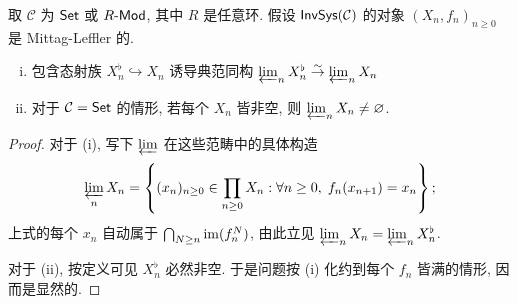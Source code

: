 \begin{lemma}\label{prop:ML-nonempty}
	取 $\mathcal{C}$ 为 $\cate{Set}$ 或 $R\dcate{Mod}$, 其中 $R$ 是任意环. 假设 $\cate{InvSys}(\mathcal{C})$ 的对象 $(X_n, f_n)_{n \geq 0}$ 是 Mittag-Leffler 的.
	\begin{enumerate}[(i)]
		\item 包含态射族 $X_n^\flat \hookrightarrow X_n$ 诱导典范同构 $\varprojlim_n X^\flat_n \rightiso \varprojlim_n X_n$
		\item 对于 $\mathcal{C} = \cate{Set}$ 的情形, 若每个 $X_n$ 皆非空, 则 $\varprojlim_n X_n \neq \emptyset$.
	\end{enumerate}
\end{lemma}
\begin{proof}
	对于 (i), 写下 $\varprojlim$ 在这些范畴中的具体构造
	\[ \varprojlim_n X_n = \left\{ (x_n)_{n \geq 0} \in \prod_{n \geq 0} X_n : \forall n \geq 0,\; f_n(x_{n+1}) = x_n \right\}; \]
	上式的每个 $x_n$ 自动属于 $\bigcap_{N \geq n} \Image(f^N_n)$, 由此立见 $\varprojlim_n X_n = \varprojlim_n X^\flat_n$.
	
	对于 (ii), 按定义可见 $X_n^\flat$ 必然非空. 于是问题按 (i) 化约到每个 $f_n$ 皆满的情形, 因而是显然的.
\end{proof}


